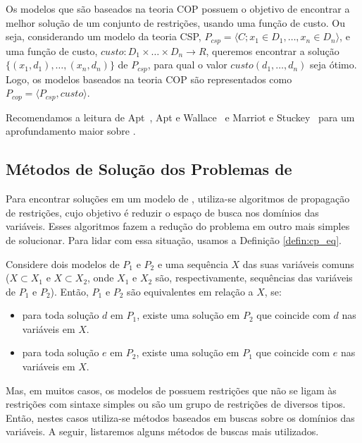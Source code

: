 Os modelos que são baseados na teoria COP possuem o objetivo de
encontrar a melhor solução de um conjunto de restrições, usando uma
função de custo. Ou seja, considerando um modelo da teoria CSP,
$P_{csp} = \langle C; x_{1} \in D_{1}, \ldots, x_{n} \in
D_{n} \rangle$, e uma função de custo, $custo:
D_{1} \times \ldots \times D_{n} \to R$, queremos encontrar a solução
$\{(x_{1}, d_{1}), \ldots, (x_{n}, d_{n})\}$ de $P_{csp}$, para qual o
valor $custo(d_{1}, \ldots, d_{n})$ seja ótimo. Logo, os modelos
baseados na teoria COP são representados como $P_{cop} = \langle P_{csp},
custo \rangle$.

Recomendamos a leitura de Apt~\cite{Apt*2003}, Apt e
Wallace~\cite{AptWallace*2007} e Marriot e
Stuckey~\cite{Marriott*1998} para um aprofundamento maior sobre \pr{}.

\subsection{Métodos de Solução dos Problemas de \PR{}}
\label{subsec:sol_cp}
Para encontrar soluções em um modelo de \pr{}, utiliza-se algoritmos
de propagação de restrições, cujo objetivo é reduzir o espaço de busca
nos domínios das variáveis. Esses algoritmos fazem a redução do
problema em outro mais simples de solucionar. Para lidar com essa
situação, usamos a Definição \ref{defin:cp_eq}.
\begin{defin}
\label{defin:cp_eq}
Considere dois modelos de \pr{} $P_{1}$ e $P_{2}$ e uma sequência $X$
das suas variáveis comuns ($X \subset X_{1}$ e $X \subset X_{2}$, onde
$X_{1}$ e $X_{2}$ são, respectivamente, sequências das variáveis de
$P_{1}$ e $P_{2}$). Então, $P_{1}$ e $P_{2}$ são equivalentes em
relação a $X$, se:
\begin{itemize}
  \item{para toda solução $d$ em $P_{1}$, existe uma solução em
  $P_{2}$ que coincide com $d$ nas variáveis em $X$.}

  \item{para toda solução $e$ em $P_{2}$, existe uma solução em
  $P_{1}$ que coincide com $e$ nas variáveis em $X$.}
\end{itemize}
\end{defin}

Mas, em muitos casos, os modelos de \pr{} possuem restrições que não
se ligam às restrições com sintaxe simples ou são um grupo de
restrições de diversos tipos. Então, nestes casos utiliza-se métodos
baseados em buscas sobre os domínios das variáveis. A seguir,
listaremos alguns métodos de buscas mais utilizados.

